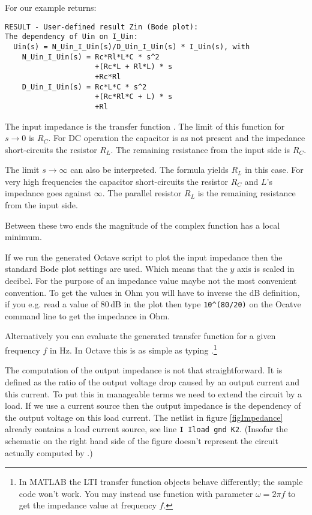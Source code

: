 For our example \linnet{} returns:
\begin{verbatim}
RESULT - User-defined result Zin (Bode plot):
The dependency of Uin on I_Uin:
  Uin(s) = N_Uin_I_Uin(s)/D_Uin_I_Uin(s) * I_Uin(s), with
    N_Uin_I_Uin(s) = Rc*Rl*L*C * s^2
                     +(Rc*L + Rl*L) * s
                     +Rc*Rl
    D_Uin_I_Uin(s) = Rc*L*C * s^2
                     +(Rc*Rl*C + L) * s
                     +Rl
\end{verbatim}
The input impedance is the transfer function
. The limit of this function for
$s \to 0$ is $R_C$. For DC operation the capacitor is as not present and
the impedance short-circuits the resistor $R_L$. The remaining resistance
from the input side is $R_C$.

The limit $s \to \infty$ can also be interpreted. The formula yields $R_L$
in this case. For very high frequencies the capacitor short-circuits the
resistor $R_C$ and $L$'s impedance goes against $\infty$. The parallel
resistor $R_L$ is the remaining resistance from the input side.

Between these two ends the magnitude of the complex function has a local
minimum.

If we run the generated Octave script  to plot the input
impedance then the standard Bode plot settings are used. Which means that
the $y$ axis is scaled in decibel. For the purpose of an impedance value
maybe not the most convenient convention. To get the values in Ohm
you will have to inverse the dB definition, if you e.g. read a value of
80\,dB in the plot then type \verb+10^(80/20)+ on the Ocatve command
line to get the impedance in Ohm.

Alternatively you can evaluate the generated transfer function for a given
frequency $f$ in Hz. In Octave this is as simple as typing
.\footnote{In MATLAB the LTI transfer function
objects behave differently; the sample code won't work. You may instead
use function  with parameter $\omega=2 \pi f$ to get the
impedance value at frequency $f$.}

The computation of the output impedance is not that straightforward. It is
defined as the ratio of the output voltage drop caused by an output
current and this current. To put this in \linnet{} manageable terms we
need to extend the circuit by a load. If we use a current source then the
output impedance is the dependency of the output voltage on this load
current. The netlist in figure \ref{figImpedance} already contains a load
current source, see line \verb+I Iload gnd K2+. (Insofar the schematic on
the right hand side of the figure doesn't represent the circuit actually
computed by \linnet{}.)

